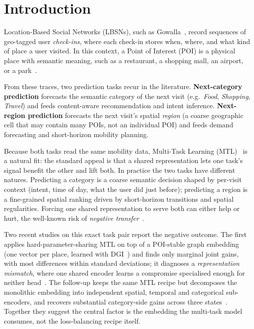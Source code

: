 \section{Introduction}
\label{sec:intro}

Location-Based Social Networks (LBSNs), such as Gowalla~\cite{cho2011gowalla}, record sequences of geo-tagged user \emph{check-ins}, where each check-in stores when, where, and what kind of place a user visited. In this context, a Point of Interest (POI) is a physical place with semantic meaning, such as a restaurant, a shopping mall, an airport, or a park~\cite{silva2025mtlnet}.

From these traces, two prediction tasks recur in the literature. \textbf{Next-category prediction} forecasts the semantic category of the next visit (e.g.\ \emph{Food}, \emph{Shopping}, \emph{Travel}) and feeds content-aware recommendation and intent inference. \textbf{Next-region prediction} forecasts the next visit's spatial \emph{region} (a coarse geographic cell that may contain many POIs, not an individual POI) and feeds demand forecasting and short-horizon mobility planning.

Because both tasks read the same mobility data, Multi-Task Learning (MTL)~\cite{caruana1997multitask,vandenhende2022mtl} is a natural fit: the standard appeal is that a shared representation lets one task's signal benefit the other and lift both. In practice the two tasks have different natures. Predicting a category is a coarse semantic decision shaped by per-visit context (intent, time of day, what the user did just before); predicting a region is a fine-grained spatial ranking driven by short-horizon transitions and spatial regularities. Forcing one shared representation to serve both can either help or hurt, the well-known risk of \emph{negative transfer}~\cite{vandenhende2022mtl}.

Two recent studies on this exact task pair report the negative outcome. The first applies hard-parameter-sharing MTL on top of a POI-stable graph embedding (one vector per place, learned with DGI~\cite{velickovic2019dgi}) and finds only marginal joint gains, with most differences within standard deviations; it diagnoses a \emph{representation mismatch}, where one shared encoder learns a compromise specialised enough for neither head~\cite{silva2025mtlnet}. The follow-up keeps the same MTL recipe but decomposes the monolithic embedding into independent spatial, temporal and categorical sub-encoders, and recovers substantial category-side gains across three states~\cite{paiva2026courb}. Together they suggest the central factor is the embedding the multi-task model consumes, not the loss-balancing recipe itself.

